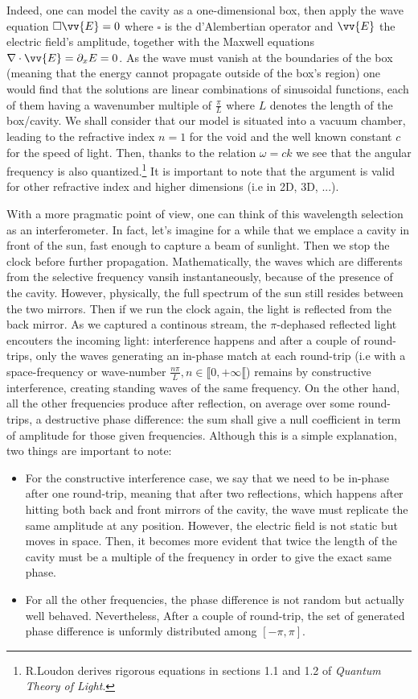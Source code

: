 \documentclass[10pt]{report}
\begin{document}
Indeed, one can model the cavity as a one-dimensional box, then apply the wave equation $ \square \vv{E} = 0$ where $\square$ is the d'Alembertian operator and $\vv{E}$ the electric field's amplitude, together with the Maxwell equations $\nabla \cdot \vv{E} = \partial _x E = 0$. As the wave must vanish at the boundaries of the box (meaning that the energy cannot propagate outside of the box's region) one would find that the solutions are linear combinations of sinusoidal functions, each of them having a wavenumber multiple of $\frac{\pi}{L}$ where $L$ denotes the length of the box/cavity. We shall consider that our model is situated into a vacuum chamber, leading to the refractive index $n=1$ for the void and the well known constant $ c$ for the speed of light. Then, thanks to the relation $\omega = ck$ we see that the angular frequency is also quantized.\footnote{R.Loudon derives rigorous equations in sections 1.1 and 1.2 of \textit{Quantum Theory of Light}.} It is important to note that the argument is valid for other refractive index and higher dimensions (i.e in 2D, 3D, ...).

With a more pragmatic point of view, one can think of this wavelength selection as an interferometer. In fact, let's imagine for a while that we emplace a cavity in front of the sun, fast enough to capture a beam of sunlight. Then we stop the clock before further propagation. Mathematically, the waves which are differents from the selective frequency vansih instantaneously, because of the presence of the cavity. However, physically, the full spectrum of the sun still resides between the two mirrors. Then if we run the clock again, the light is reflected from the back mirror. As we captured a continous stream, the $\pi$-dephased reflected light encouters the incoming light: interference happens and after a couple of round-trips, only the waves generating an in-phase match at each round-trip (i.e with a space-frequency or wave-number $\frac{n\pi}{L}, n\in \llbracket 0, +\infty \llbracket $) remains by constructive interference, creating standing waves of the same frequency. On the other hand, all the other frequencies produce after reflection, on average over some round-trips, a destructive phase difference: the sum shall give a null coefficient in term of amplitude for those given frequencies. Although this is a simple explanation, two things are important to note:
\begin{itemize}
  \item For the constructive interference case, we say that we need to be in-phase after one round-trip, meaning that after two reflections, which happens after hitting both back and front mirrors of the cavity, the wave must replicate the same amplitude at any position. However, the electric field is not static but moves in space. Then, it becomes more evident that twice the length of the cavity must be a multiple of the frequency in order to give the exact same phase.
  \item  For all the other frequencies, the phase difference is not random but actually well behaved. Nevertheless, After a couple of round-trip, the set of generated phase difference is unformly distributed among $ \left[ -\pi, \pi \right] $.
\end{itemize}
\end{document}
